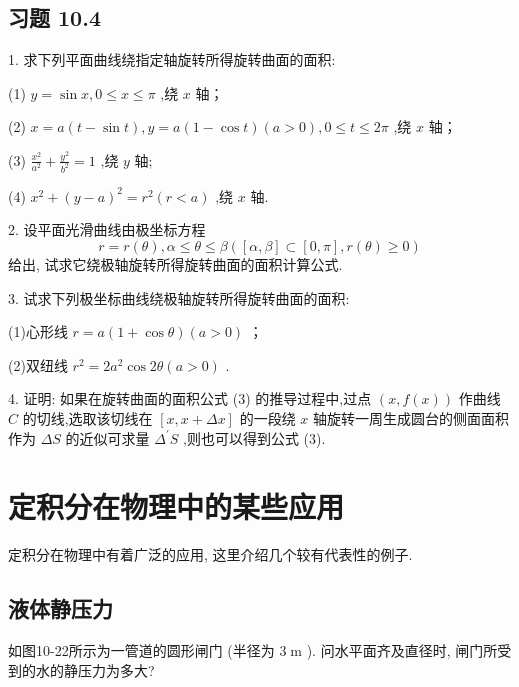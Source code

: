\subsection{习题 10.4}

1. 求下列平面曲线绕指定轴旋转所得旋转曲面的面积:

(1) \(y = \sin x,0 \leq  x \leq  \pi\) ,绕 \(x\) 轴；

(2) \(x = a\left( {t - \sin t}\right) ,y = a\left( {1 - \cos t}\right) \left( {a > 0}\right) ,0 \leq  t \leq  {2\pi }\) ,绕 \(x\) 轴；

(3) \(\frac{{x}^{2}}{{a}^{2}} + \frac{{y}^{2}}{{b}^{2}} = 1\) ,绕 \(y\) 轴;

(4) \({x}^{2} + {\left( y - a\right) }^{2} = {r}^{2}\left( {r < a}\right)\) ,绕 \(x\) 轴.

2. 设平面光滑曲线由极坐标方程
\[
r = r\left( \theta \right) ,\alpha  \leq  \theta  \leq  \beta \left( {\left\lbrack  {\alpha ,\beta }\right\rbrack   \subset  \left\lbrack  {0,\pi }\right\rbrack  ,r\left( \theta \right)  \geq  0}\right)
\]
给出, 试求它绕极轴旋转所得旋转曲面的面积计算公式.

3. 试求下列极坐标曲线绕极轴旋转所得旋转曲面的面积:

(1)心形线 \(r = a\left( {1 + \cos \theta }\right) \left( {a > 0}\right)\) ；

(2)双纽线 \({r}^{2} = 2{a}^{2}\cos {2\theta }\left( {a > 0}\right)\) .

4. 证明: 如果在旋转曲面的面积公式 (3) 的推导过程中,过点 \(\left( {x,f\left( x\right) }\right)\) 作曲线 \(C\) 的切线,选取该切线在 \(\left\lbrack  {x,x + {\Delta x}}\right\rbrack\) 的一段绕 \(x\) 轴旋转一周生成圆台的侧面面积作为 \({\Delta S}\) 的近似可求量 \({\Delta }^{\prime }S\) ,则也可以得到公式 (3).

\section{定积分在物理中的某些应用}

定积分在物理中有着广泛的应用, 这里介绍几个较有代表性的例子.

\subsection{液体静压力}

\begin{example}

\end{example}
如图10-22所示为一管道的圆形闸门 (半径为 \(3\mathrm{\;m}\) ). 问水平面齐及直径时, 闸门所受到的水的静压力为多大?

